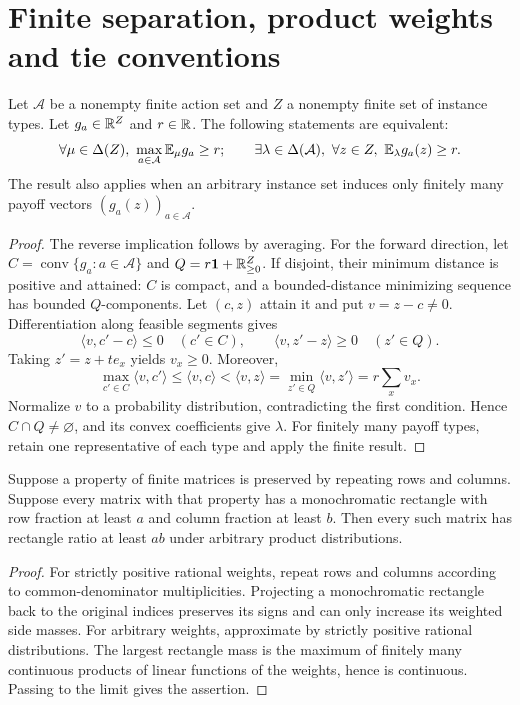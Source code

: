 \section{Finite separation, product weights and tie conventions}\label{app:foundations}
\begin{lemma}\label{lem:finite-minimax}
Let $\mathcal A$ be a nonempty finite action set and $Z$ a nonempty finite set of instance types. Let $g_a\in\mathbb R^Z$ and $r\in\mathbb R$. The following statements are equivalent:
\[
 \forall\mu\in\Delta(Z),\ \max_{a\in\mathcal A}\E_\mu g_a\ge r;
 \qquad
 \exists\lambda\in\Delta(\mathcal A),\ \forall z\in Z,\ \E_\lambda g_a(z)\ge r.
\]
The result also applies when an arbitrary instance set induces only finitely many payoff vectors $(g_a(z))_{a\in\mathcal A}$.
\end{lemma}
\begin{proof}
The reverse implication follows by averaging. For the forward direction, let $C=\operatorname{conv}\{g_a:a\in\mathcal A\}$ and $Q=r\mathbf 1+\mathbb R_{\ge0}^Z$. If disjoint, their minimum distance is positive and attained: $C$ is compact, and a bounded-distance minimizing sequence has bounded $Q$-components. Let $(c,z)$ attain it and put $v=z-c\ne0$. Differentiation along feasible segments gives
\[
 \langle v,c'-c\rangle\le0\quad(c'\in C),\qquad
 \langle v,z'-z\rangle\ge0\quad(z'\in Q).
\]
Taking $z'=z+te_x$ yields $v_x\ge0$. Moreover,
\[
 \max_{c'\in C}\langle v,c'\rangle
 \le\langle v,c\rangle<\langle v,z\rangle
 =\min_{z'\in Q}\langle v,z'\rangle=r\sum_xv_x.
\]
Normalize $v$ to a probability distribution, contradicting the first condition. Hence $C\cap Q\ne\varnothing$, and its convex coefficients give $\lambda$. For finitely many payoff types, retain one representative of each type and apply the finite result.
\end{proof}

\begin{lemma}\label{lem:product-weights}
Suppose a property of finite matrices is preserved by repeating rows and columns. Suppose every matrix with that property has a monochromatic rectangle with row fraction at least $a$ and column fraction at least $b$. Then every such matrix has rectangle ratio at least $ab$ under arbitrary product distributions.
\end{lemma}
\begin{proof}
For strictly positive rational weights, repeat rows and columns according to common-denominator multiplicities. Projecting a monochromatic rectangle back to the original indices preserves its signs and can only increase its weighted side masses. For arbitrary weights, approximate by strictly positive rational distributions. The largest rectangle mass is the maximum of finitely many continuous products of linear functions of the weights, hence is continuous. Passing to the limit gives the assertion.
\end{proof}

